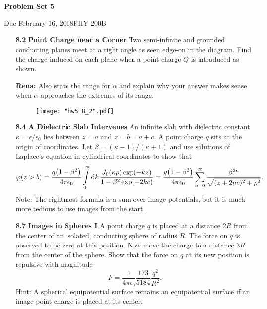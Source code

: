 \documentclass{article}
\newcommand{\Title}     {Problem Set 5}
\newcommand{\DueDate}   {February 16, 2018}
\newcommand{\Course}    {PHY 200B}
\begin{document}
{\huge\textbf{\Title}}

Due \DueDate \hfill \Course

\hrulefill



\begin{enumerate}
    \item [\textbf{8.2}] \textbf{Point Charge near a Corner } Two semi-infinite and grounded conducting planes meet at a right angle as seen edge-on in the diagram. Find the charge induced on each plane when a point charge $Q$ is introduced as shown.

    \textbf{Rena:} Also state the range for $\alpha$ and explain why your answer makes sense when $\alpha$ approaches the extremes of its range.

    \begin{figure}[H]
    \centering
    \texttt{[image: "hw5 8\_2".pdf]}
    \end{figure}

    \item [\textbf{8.4}] \textbf{A Dielectric Slab Intervenes } An infinite slab with dielectric constant $\kappa = \epsilon/\epsilon_0$ lies between $z=a$ and $z=b=a+c$. A point charge $q$ sits at the origin of coordinates. Let $\beta = (\kappa -1)/(\kappa +1)$ and use solutions of Laplace's equation in cylindrical coordinates to show that
    \[
        \varphi(z>b) = \frac{q\pqty{1-\beta^2}}{4\pi\epsilon_0}\int\limits_0^\infty \dd{k} \frac{J_0(\kappa\rho)\exp(-kz)}{1-\beta^2\exp(-2kc)} = \frac{q\pqty{1-\beta^2}}{4\pi\epsilon_0}\sum_{n=0}^\infty \frac{\beta^{2n}}{\sqrt{(z+2nc)^2+\rho^2}}.
    \]
    Note: The rightmost formula is a sum over image potentials, but it is much more tedious to use images from the start.

    \item [\textbf{8.7}] \textbf{Images in Spheres I } A point charge $q$ is placed at a distance $2R$ from the center of an isolated, conducting sphere of radius $R$. The force on $q$ is observed to be zero at this position. Now move the charge to a distance $3R$ from the center of the sphere. Show that the force on $q$ at its new position is repulsive with magnitude
    \[
        F = \frac{1}{4\pi\epsilon_0}\frac{173}{5184}\frac{q^2}{R^2}.
    \]
    Hint: A spherical equipotential surface remains an equipotential surface if an image point charge is placed at its center.


\end{enumerate}
\end{document}
